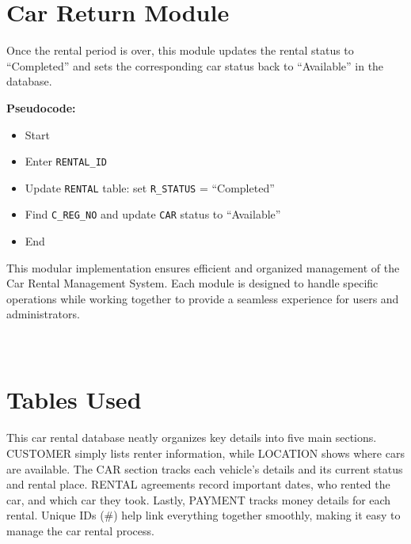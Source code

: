 \documentclass[12pt,a4paper]{report}
\begin{document}
\section*{Car Return Module}
Once the rental period is over, this module updates the rental status to ``Completed'' and sets the corresponding car status back to ``Available'' in the database.

\textbf{Pseudocode:}
\begin{itemize}
    \item Start
    \item Enter \texttt{RENTAL\_ID}
    \item Update \texttt{RENTAL} table: set \texttt{R\_STATUS} = ``Completed''
    \item Find \texttt{C\_REG\_NO} and update \texttt{CAR} status to ``Available''
    \item End
\end{itemize}

\para\noindent This modular implementation ensures efficient and organized management of the Car Rental Management System. Each module is designed to handle specific operations while working together to provide a seamless experience for users and administrators.
\\
\\
\\

\section{Tables Used}
\par This car rental database neatly organizes key details into five main sections. CUSTOMER simply lists renter information, while LOCATION shows where cars are available. The CAR section tracks each vehicle's details and its current status and rental place. RENTAL agreements record important dates, who rented the car, and which car they took. Lastly, PAYMENT tracks money details for each rental. Unique IDs (#) help link everything together smoothly, making it easy to manage the car rental process.\\
\end{document}

